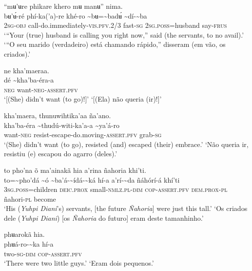 \documentclass[output=paper,
modfonts,nonflat
]{langsci/langscibook}
\begin{document}
\ea “mʉ'ʉre phikare khero mʉ manʉ” nima. \\[.3em]
\gll {\textasciitilde}bʉ'ʉ́-ré	phí-ka('a)-re	khé-ro	{\textasciitilde}bʉ={\textasciitilde}badʉ́	{\textasciitilde}dí-{\textasciitilde}ba \\
     2\textsc{sg-obj}	call-do.immediately-\textsc{vis.pfv.}2/3	fast\textsc{-sg}	2\textsc{sg.poss}=husband	say-\textsc{frus} \\
\glt ‘“Your (true) husband is calling you right now,” said (the servants, to no avail).’
\glt ‘“O seu marido (verdadeiro) está chamando rápido,” disseram (em vão, os criados).’
\z

\ea ne kha'maeraa.\\[.3em]
\gll {\textasciitilde}dé	{\textasciitilde}kha'ba-éra-a\\
     \textsc{neg}	want-\textsc{neg-assert.pfv}\\
\glt ‘[(She) didn't want (to go)!]’{\footnotemark}
\glt ‘[(Ela) não queria (ir)!]’
\z 

\ea kha'maera, thunuwihtika'aa ña'ano.\\[.3em]
\gll {\textasciitilde}kha'ba-éra	{\textasciitilde}thudú-witi-ka'a-a	{\textasciitilde}ya'á-ro{\footnotemark}\\
     want\textsc{-neg}	resist-escape-do.moving-\textsc{assert.pfv}	grab\textsc{-sg}\\
\glt ‘(She) didn't want (to go), resisted (and) escaped (their) embrace.’
\glt ‘Não queria ir, resistiu (e) escapou do agarro (deles).’
\z 

\ea to pho'na õ ma'ainakã hia a’rina ñahoria khi'ti.\\[.3em]
\gll to={\textasciitilde}pho'dá	{\textasciitilde}ó	{\textasciitilde}ba'á-{\textasciitilde}ídá-{\textasciitilde}ká	hí-a	a’rí-{\textasciitilde}da	ñáhórí-á khí'ti\\
     3\textsc{sg.poss}=children	\textsc{deic.prox}	small-\textsc{nmlz.pl-dim}	\textsc{cop-assert.pfv}	\textsc{dem.prox-pl}	ñahori-\textsc{pl}	become\\
\glt ‘His (\textit{Yuhpi Diani}'s) servants, [the future \textit{Ñahoria}] were just this tall.’
\glt ‘Os criados dele (\textit{Yuhpi Diani}) [os \textit{Ñahoria} do futuro] eram deste tamanhinho.’
\z 

 
\ea phʉarokã hia.\\[.3em]
\gll phʉá-ro-{\textasciitilde}ka	hí-a\\
     two\textsc{-sg-dim}	\textsc{cop-assert.pfv}\\
\glt ‘There were two little guys.’
\glt ‘Eram dois pequenos.’
\z 
\end{document}
